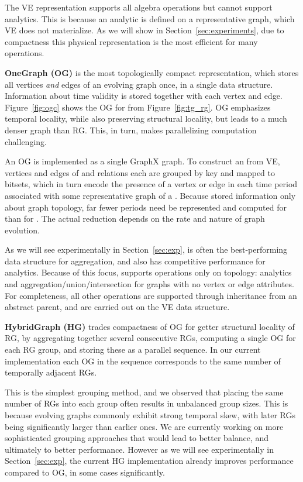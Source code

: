 The VE representation supports all \tg algebra operations but cannot
support analytics.  This is because an analytic is defined on a
representative graph, which VE does not materialize.  As we will show
in Section~\ref{sec:experiments}, due to compactness this physical
representation is the most efficient for many operations.

{\bf OneGraph (OG)} is the most topologically compact representation,
which stores all vertices {\em and} edges of an evolving graph once,
in a single data structure.  Information about time validity is stored
together with each vertex and edge.  Figure~\ref{fig:ogc} shows the OG
for \tg {} from Figure~\ref{fig:tg_rg}.  OG emphasizes
temporal locality, while also preserving structural locality, but
leads to a much denser graph than RG.  This, in turn, makes
parallelizing computation challenging.

An OG is implemented as a single GraphX graph.  To construct an \og
from VE, vertices and edges of \tv and \te relations each are grouped
by key and mapped to bitsets, which in turn encode the presence of a
vertex or edge in each time period associated with some representative
graph of a \tg.  Because \og stored information only about graph
topology, far fewer periods need be represented and computed for \og
than for \rg.  The actual reduction depends on the rate and nature of
graph evolution.

As we will see experimentally in Section~\ref{sec:exp}, \og is often
the best-performing data structure for aggregation, and also has
competitive performance for analytics.  Because of this focus, \og
supports operations only on topology: analytics and
aggregation/union/intersection for graphs with no vertex or edge
attributes.  For completeness, all other operations are supported
through inheritance from an abstract parent, and are carried out on
the VE data structure.

{\bf HybridGraph (HG)} trades compactness of OG for getter structural
locality of RG, by aggregating together several consecutive RGs,
computing a single OG for each RG group, and storing these as a
parallel sequence.  In our current implementation each OG in the
sequence corresponds to the same number of temporally adjacent RGs.

This is the simplest grouping method, and we observed that placing the
same number of RGs into each group often results in unbalanced group
sizes.  This is because evolving graphs commonly exhibit strong
temporal skew, with later RGs being significantly larger than earlier
ones.  We are currently working on more sophisticated grouping
approaches that would lead to better balance, and ultimately to better
performance.  However as we will see experimentally in
Section~\ref{sec:exp}, the current HG implementation already improves
performance compared to OG, in some cases significantly.

